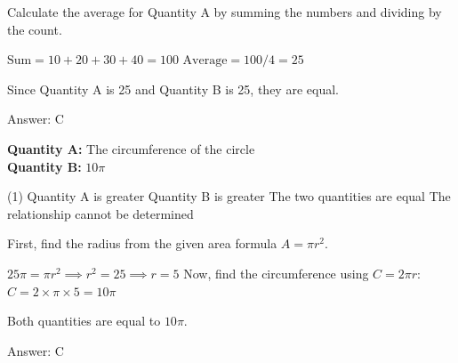 \documentclass[11pt,paper=a4,answers]{exam}
\begin{document}
\begin{questions}
\begin{solution}
Calculate the average for Quantity A by summing the numbers and dividing by the count.
\vspace{5pt}
\begin{center}
$\text{Sum} = 10 + 20 + 30 + 40 = 100$
\vspace{5pt}
$\text{Average} = 100 / 4 = 25$
\end{center}
\vspace{5pt}
Since Quantity A is 25 and Quantity B is 25, they are equal.

Answer: \colorbox{yellow!100}{C}
\end{solution}

\vspace{1cm}

\question
\begin{center}
\end{center}
\vspace{5pt}
\textbf{Quantity A: } The circumference of the circle \\
\vspace{5pt}
\textbf{Quantity B: } $10\pi$

\begin{tasks}(1)
\task[A)] Quantity A is greater
\task[B)] Quantity B is greater
\task[C)] The two quantities are equal
\task[D)] The relationship cannot be determined
\end{tasks}

\begin{solution}
First, find the radius from the given area formula $A = \pi r^2$.
\vspace{5pt}
\begin{center}
$25\pi = \pi r^2 \implies r^2 = 25 \implies r = 5$
\vspace{5pt}
Now, find the circumference using $C = 2\pi r$:
\vspace{5pt}
$C = 2 \times \pi \times 5 = 10\pi$
\end{center}
\vspace{5pt}
Both quantities are equal to $10\pi$.

Answer: \colorbox{yellow!100}{C}
\end{solution}

\vspace{1cm}


\end{questions}
\end{document}
